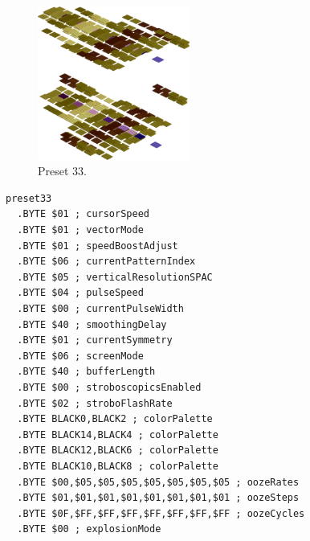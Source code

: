 \clearpage
\begin{minipage}[b]{0.48\linewidth}
\begin{figure}[H]                                                          
  \centering                                                             
  \begin{adjustbox}{width=5cm,center}                                   
  \includegraphics[width=5cm]{src/colorspace_presets/preset33-45.png}%
  \end{adjustbox}                                                        
\caption*{Preset 33.}                                           
\end{figure}                                                               
\end{minipage}
\hspace{0.1cm}
\begin{minipage}[b]{0.48\linewidth}                            
\begin{lstlisting}[basicstyle=\ttfamily\tiny]
preset33
  .BYTE $01 ; cursorSpeed
  .BYTE $01 ; vectorMode
  .BYTE $01 ; speedBoostAdjust
  .BYTE $06 ; currentPatternIndex
  .BYTE $05 ; verticalResolutionSPAC
  .BYTE $04 ; pulseSpeed
  .BYTE $00 ; currentPulseWidth
  .BYTE $40 ; smoothingDelay
  .BYTE $01 ; currentSymmetry
  .BYTE $06 ; screenMode
  .BYTE $40 ; bufferLength
  .BYTE $00 ; stroboscopicsEnabled
  .BYTE $02 ; stroboFlashRate
  .BYTE BLACK0,BLACK2 ; colorPalette
  .BYTE BLACK14,BLACK4 ; colorPalette
  .BYTE BLACK12,BLACK6 ; colorPalette
  .BYTE BLACK10,BLACK8 ; colorPalette
  .BYTE $00,$05,$05,$05,$05,$05,$05,$05 ; oozeRates
  .BYTE $01,$01,$01,$01,$01,$01,$01,$01 ; oozeSteps
  .BYTE $0F,$FF,$FF,$FF,$FF,$FF,$FF,$FF ; oozeCycles
  .BYTE $00 ; explosionMode
\end{lstlisting}
\end{minipage}

\vspace*{0.3cm}

